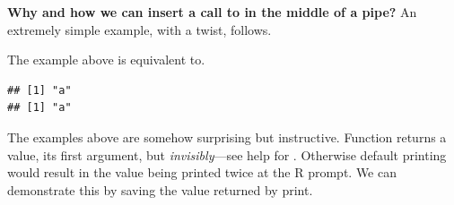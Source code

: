 \documentclass[krantz2,ChapterTOCs]{krantz}\usepackage{knitr}
\begin{document}
\begin{explainbox}
\textbf{Why and how we can insert a call to  in the middle of a pipe?} An extremely simple example, with a twist, follows.

\begin{knitrout}\footnotesize
{}\color{fgcolor}
\end{knitrout}

The example above is equivalent to.

\begin{knitrout}\footnotesize
{}\color{fgcolor}\begin{kframe}
\begin{alltt}
\hlstd{(}\hlstd{(}\hlstd{))}
\end{alltt}
\begin{verbatim}
## [1] "a"
## [1] "a"
\end{verbatim}
\end{kframe}
\end{knitrout}

The examples above are somehow surprising but instructive. Function  returns a value, its first argument, but \emph{invisibly}---see help for . Otherwise default printing would result in the value being printed twice at the R prompt. We can demonstrate this by saving the value returned by print.


\end{explainbox}
\end{document}
